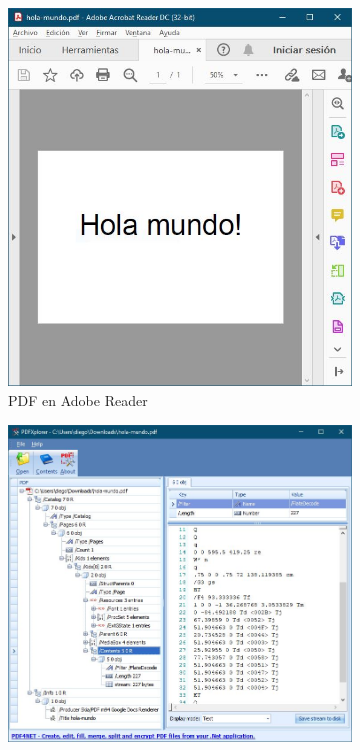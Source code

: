 \begin{figure}
    \centering
    \begin{subfigure}[b]{0.29\textwidth}
        \centering
        \includegraphics[width=\textwidth]{imaxes/c-bases-teoricas/hola-mundo-adobe-reader}
        \caption{PDF en Adobe Reader}
        \label{fig:hola-mundo-adobe-reader}
    \end{subfigure}
    \hfill
    \begin{subfigure}[b]{0.7\textwidth}
        \centering
        \includegraphics[width=\textwidth]{imaxes/c-bases-teoricas/hola-mundo-pdfxplorer}

\end{subfigure}
\end{figure}
